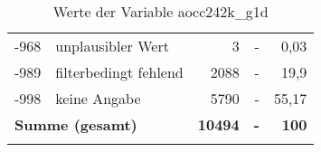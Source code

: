 \begin{longtable}{Xlrrr}
       -968 & unplausibler Wert & 3 & - & 0,03 \\

       -989 & filterbedingt fehlend & 2088 & - & 19,9 \\

       -998 & keine Angabe & 5790 & - & 55,17 \\

     \midrule
     \multicolumn{2}{l}{\textbf{Summe (gesamt)}} & \textbf{10494} & \textbf{-} & \textbf{100} \\
     \bottomrule
     \caption{Werte der Variable aocc242k\_g1d}
     \end{longtable}
     
